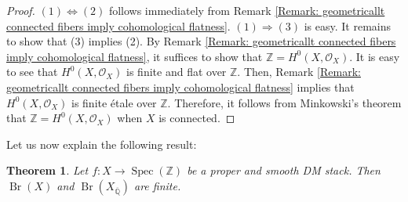 \documentclass{amsart}
\newtheorem{thm}[prop]{Theorem}
\theoremstyle{definition}
\theoremstyle{remark}
\DeclareMathOperator{\Spec}{Spec}
\DeclareMathOperator{\Br}{Br}
\newcommand{\ZZ}{\mathbb Z}
\newcommand{\QQ}{\mathbb Q}
\begin{document}
\begin{proof}
    $(1) \Leftrightarrow (2)$ follows immediately from Remark \ref{Remark: geometricallt connected fibers imply cohomological flatness}.
    $(1) \Rightarrow (3)$ is easy.
    It remains to show that (3) implies (2).
    By Remark \ref{Remark: geometricallt connected fibers imply cohomological flatness}, it suffices to show that $\ZZ=H^{0}(X,\mathcal{O}_{X})$.
    It is easy to see that
    $H^{0}(X,\mathcal{O}_{X})$
    is finite and flat over $\ZZ$.
    Then, Remark \ref{Remark: geometricallt connected fibers imply cohomological flatness} implies that $H^{0}(X,\mathcal{O}_{X})$ is finite \'etale over $\ZZ$.
    Therefore, it follows from Minkowski's theorem that $\ZZ=H^{0}(X,\mathcal{O}_{X})$ when $X$ is connected.
\end{proof}


Let us now explain the following result:

\begin{thm}\label{Theorem:finiteness of Brauer group}
    Let $f\colon X\rightarrow \Spec(\ZZ)$ be a proper and smooth
    DM stack.
    Then
    $
    \Br(X)
    $
    and
    $
    \Br(X_{\overline{\QQ}})
    $
    are finite.
\end{thm}
\end{document}
